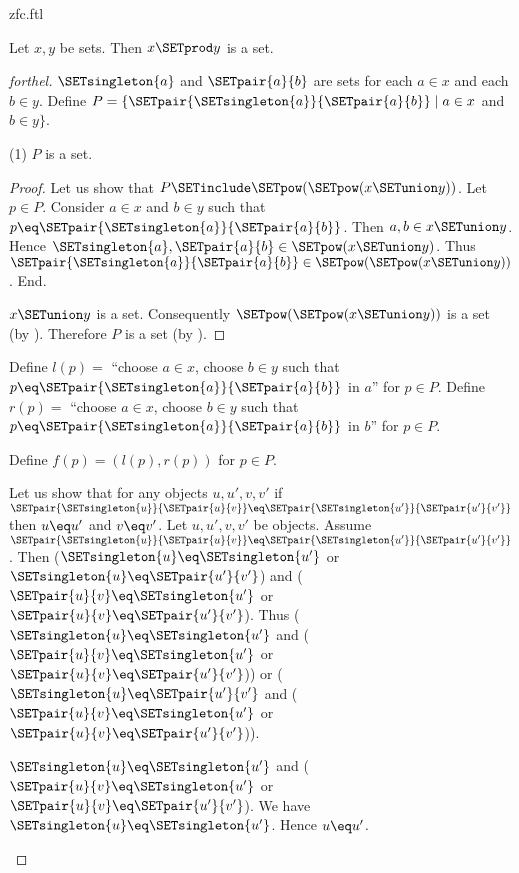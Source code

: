 \documentclass{naproche-library}
\begin{document}
\begin{smodule}[title=ZFC]{zfc.ftl}
\begin{proposition}[forthel,id=FOUNDATIONS_10_4458706448154624]
  Let $x, y$ be sets.
  Then $x \SETprod y$ is a set.
\end{proposition}
\begin{proof}[forthel]
  $\SETsingleton{a}$ and $\SETpair{a}{b}$ are sets for each $a \in x$ and each $b \in y$.
  Define $P = \{ \SETpair{\SETsingleton{a}}{\SETpair{a}{b}} \mid a \in x$ and $b \in y \}$.

  (1) $P$ is a set.
  \begin{proof}
    Let us show that $P \SETinclude \SETpow(\SETpow(x \SETunion y))$.
      Let $p \in P$.
      Consider $a \in x$ and $b \in y$ such that $p \eq \SETpair{\SETsingleton{a}}{\SETpair{a}{b}}$.
      Then $a, b \in x \SETunion y$.
      Hence $\SETsingleton{a}, \SETpair{a}{b} \in \SETpow(x \SETunion y)$.
      Thus $\SETpair{\SETsingleton{a}}{\SETpair{a}{b}} \in \SETpow(\SETpow(x \SETunion y))$.
    End.

    $x \SETunion y$ is a set.
    Consequently $\SETpow(\SETpow(x \SETunion y))$ is a set (by ).
    Therefore $P$ is a set (by ).
  \end{proof}

  Define $l(p) =$ ``choose $a \in x$, choose $b \in y$ such that $p \eq \SETpair{\SETsingleton{a}}{\SETpair{a}{b}}$ in $a$'' for $p \in P$.
  Define $r(p) =$ ``choose $a \in x$, choose $b \in y$ such that $p \eq \SETpair{\SETsingleton{a}}{\SETpair{a}{b}}$ in $b$'' for $p \in P$.

  Define $f(p) = (l(p), r(p))$ for $p \in P$.

  Let us show that for any objects $u, u', v, v'$ if
  $\SETpair{\SETsingleton{u}}{\SETpair{u}{v}} \eq \SETpair{\SETsingleton{u'}}{\SETpair{u'}{v'}}$ then $u \eq u'$ and $v \eq v'$.
    Let $u, u', v, v'$ be objects.
    Assume $\SETpair{\SETsingleton{u}}{\SETpair{u}{v}} \eq \SETpair{\SETsingleton{u'}}{\SETpair{u'}{v'}}$.
    Then ($\SETsingleton{u} \eq \SETsingleton{u'}$ or $\SETsingleton{u} \eq \SETpair{u'}{v'}$) and ($\SETpair{u}{v} \eq \SETsingleton{u'}$ or $\SETpair{u}{v} \eq \SETpair{u'}{v'}$).
    Thus ($\SETsingleton{u} \eq \SETsingleton{u'}$ and ($\SETpair{u}{v} \eq \SETsingleton{u'}$ or $\SETpair{u}{v} \eq \SETpair{u'}{v'}$)) or ($\SETsingleton{u} \eq \SETpair{u'}{v'}$ and ($\SETpair{u}{v} \eq \SETsingleton{u'}$ or $\SETpair{u}{v} \eq \SETpair{u'}{v'}$)).

    \begin{case}{$\SETsingleton{u} \eq \SETsingleton{u'}$ and ($\SETpair{u}{v} \eq \SETsingleton{u'}$ or $\SETpair{u}{v} \eq \SETpair{u'}{v'}$).}
      We have $\SETsingleton{u} \eq \SETsingleton{u'}$.
      Hence $u \eq u'$.


\end{case}
\end{proof}
\end{smodule}
\end{document}
